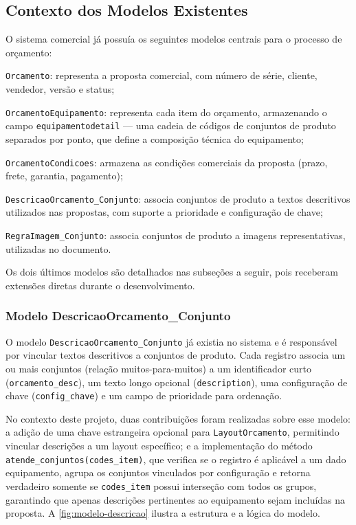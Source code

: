 \subsection{Contexto dos Modelos Existentes}

O sistema comercial já possuía os seguintes modelos centrais para o processo de orçamento:

\begin{alineas}
    \item \texttt{Orcamento}: representa a proposta comercial, com número de série, cliente, vendedor,
    versão e status;
    \item \texttt{OrcamentoEquipamento}: representa cada item do orçamento, armazenando o campo
    \texttt{equipamentodetail} --- uma cadeia de códigos de conjuntos de produto separados por ponto, que
    define a composição técnica do equipamento;
    \item \texttt{OrcamentoCondicoes}: armazena as condições comerciais da proposta (prazo, frete,
    garantia, pagamento);
    \item \texttt{DescricaoOrcamento\_Conjunto}: associa conjuntos de produto a textos descritivos
    utilizados nas propostas, com suporte a prioridade e configuração de chave;
    \item \texttt{RegraImagem\_Conjunto}: associa conjuntos de produto a imagens representativas,
    utilizadas no documento.
\end{alineas}

Os dois últimos modelos são detalhados nas subseções a seguir, pois receberam extensões diretas
durante o desenvolvimento.

\subsubsection{Modelo DescricaoOrcamento\_Conjunto}

O modelo \texttt{DescricaoOrcamento\_Conjunto} já existia no sistema e é responsável por vincular
textos descritivos a conjuntos de produto. Cada registro associa um ou mais conjuntos (relação
muitos-para-muitos) a um identificador curto (\texttt{orcamento\_desc}), um texto longo opcional
(\texttt{description}), uma configuração de chave (\texttt{config\_chave}) e um campo de
prioridade para ordenação.

No contexto deste projeto, duas contribuições foram realizadas sobre esse modelo: a adição de
uma chave estrangeira opcional para \texttt{LayoutOrcamento}, permitindo vincular descrições a
um layout específico; e a implementação do método \texttt{atende\_conjuntos(codes\_item)}, que
verifica se o registro é aplicável a um dado equipamento, agrupa os conjuntos vinculados por
configuração e retorna verdadeiro somente se \texttt{codes\_item} possui interseção com todos os
grupos, garantindo que apenas descrições pertinentes ao equipamento sejam incluídas na proposta.
A \autoref{fig:modelo-descricao} ilustra a estrutura e a lógica do modelo.

